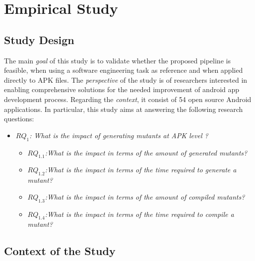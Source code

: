 
\chapter{Empirical Study} %

\label{ChapterX} %

\section{Study Design}

The main \textit{goal} of this study is to validate whether the proposed pipeline is feasible, when using a software engineering task as reference and when applied directly to APK files. The \textit{perspective} of the study is of researchers interested in enabling comprehensive solutions for the needed improvement of android app development process. Regarding the \textit{context}, it consist of 54 open source Android applications. In particular, this study aims at answering the following research questions:

\begin{itemize}
	\item \textit{\textbf{$RQ_{1}$}: What is the impact of generating mutants at APK level ?}
	\begin{itemize}
		\item \textit{\textbf{$RQ_{1.1}$}:What is the impact in terms of the amount of generated mutants?}
		\item \textit{\textbf{$RQ_{1.2}$}:What is the impact in terms of the time required to generate a mutant?}
		\item \textit{\textbf{$RQ_{1.3}$}:What is the impact in terms of the amount of compiled mutants?}
		\item \textit{\textbf{$RQ_{1.4}$}:What is the impact in terms of the time required to compile a mutant?}
	\end{itemize}
\end{itemize}

\section{Context of the Study}

